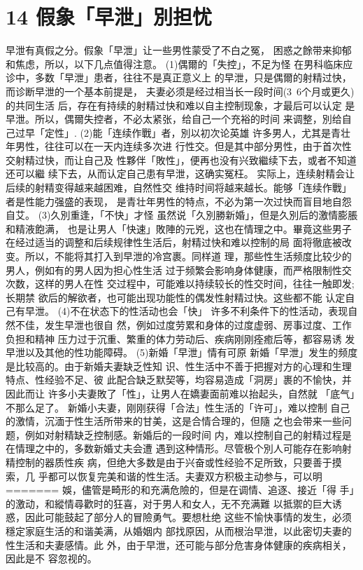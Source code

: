 \documentclass[12pt,UTF8]{ctexbook}
\begin{document}
\section{14 假象「早泄」別担忧}

早泄有真假之分。假象「早泄」让一些男性蒙受了不白之冤，
困惑之餘带来抑郁和焦虑，所以，以下几点值得注意。
(1)偶爾的「失控」，不足为怪
在男科临床应诊中，多数「早泄」患者，往往不是真正意义上
的早泄，只是偶爾的射精过快，而诊断早泄的一个基本前提是，
夫妻必须是经过相当长一段时间(3~6个月或更久)的共同生活
后，存在有持续的射精过快和难以自主控制现象，才最后可以认定
是早泄。所以，偶爾失控者，不必太紧张，给自己一个充裕的时间
来调整，別给自己过早「定性」.
(2)能「连续作戰」者，別以初次论英雄
许多男人，尤其是青壮年男性，往往可以在一天内连续多次进
行性交。但是其中部分男性，由于首次性交射精过快，而让自己及
性夥伴「敗性」，便再也没有兴致繼续下去，或者不知道还可以繼
续下去，从而认定自己患有早泄，这确实冤枉。
实际上，连续射精会让后续的射精变得越来越困难，自然性交
维持时间将越来越长。能够「连续作戰」者是性能力强盛的表现，
是青壮年男性的特点，不必为第一次过快而盲目地自怨自艾。
(3)久別重逢，「不快」才怪
虽然说「久別勝新婚」，但是久別后的激情膨脹和精液飽满，
也是让男人「快速」敗陣的元兇，这也在情理之中。畢竟这些男子
在经过适当的调整和后续规律性生活后，射精过快和难以控制的局
面将徹底被改变。所以，不能将其打入到早泄的冷宫裹。同样道
理，那些性生活频度比较少的男人，例如有的男人因为担心性生活
过于频繁会影响身体健康，而严格限制性交次数，这样的男人在性
交过程中，可能难以持续较长的性交时间，往往一触即发;长期禁
欲后的解欲者，也可能出现功能性的偶发性射精过快。这些都不能
认定自己有早泄。
(4)不在状态下的性活动也会「快」
许多不利条件下的性活动，表现自然不佳，发生早泄也很自
然，例如过度劳累和身体的过度虚弱、房事过度、工作负担和精神
压力过于沉重、繁重的体力劳动后、疾病刚刚痊癒后等，都容易诱
发早泄以及其他的性功能障碍。
(5)新婚「早泄」情有可原
新婚「早泄」发生的频度是比较高的。由于新婚夫妻缺乏性知
识、性生活中不善于把握对方的心理和生理特点、性经验不足、彼
此配合缺乏默契等，均容易造成「洞房」裹的不愉快，并因此而让
许多小夫妻敗了「性」，让男人在嬌妻面前难以抬起头，自然就
「底气」不那么足了。
新婚小夫妻，刚刚获得「合法」性生活的「许可」，难以控制
自己的激情，沉湎于性生活所带来的甘美，这是合情合理的，但隨
之也会带来一些问题，例如对射精缺乏控制感。新婚后的一段时间
内，难以控制自己的射精过程是在情理之中的，多数新婚丈夫会遭
遇到这种情形。尽管极个別人可能存在影响射精控制的器质性疾
病，但绝大多数是由于兴奋或性经验不足所致，只要善于摸索，几
乎都可以恢复完美和谐的性生活。夫妻双方积极主动参与，可以明
=======
娛，儘管是畸形的和充满危險的，但是在调情、追逐、接近「得
手」的激动，和縱情尋歡时的狂喜，对于男人和女人，无不充满難
以抵禦的巨大诱惑，因此可能鼓起了部分人的冒險勇气。要想杜绝
这些不愉快事情的发生，必须穩定家庭生活的和谐美满，从婚姻内
部找原因，从而根治早泄，以此密切夫妻的性生活和夫妻感情。此
外，由于早泄，还可能与部分危害身体健康的疾病相关，因此是不
容忽视的。
\end{document}
